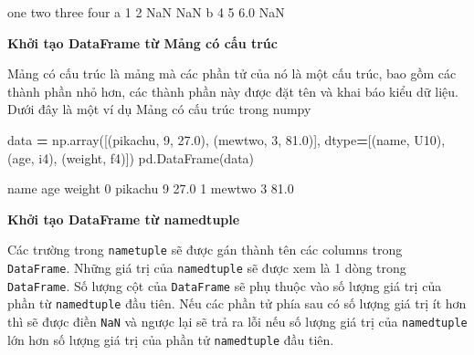 \documentclass[
]{book}
\newenvironment{Shaded}{\begin{snugshade}}{\end{snugshade}}
\newcommand{\DecValTok}[1]{\textcolor[rgb]{0.00,0.00,0.81}{#1}}
\newcommand{\FloatTok}[1]{\textcolor[rgb]{0.00,0.00,0.81}{#1}}
\newcommand{\NormalTok}[1]{#1}
\newcommand{\OperatorTok}[1]{\textcolor[rgb]{0.81,0.36,0.00}{\textbf{#1}}}
\newcommand{\StringTok}[1]{\textcolor[rgb]{0.31,0.60,0.02}{#1}}
\begin{document}
\begin{Shaded}
\begin{Highlighting}[]
\NormalTok{   one  two  three  four}
\NormalTok{a    1    2    NaN   NaN}
\NormalTok{b    4    5    6.0   NaN}
\end{Highlighting}
\end{Shaded}

\textbf{Khởi tạo DataFrame từ Mảng có cấu trúc}

Mảng có cấu trúc là mảng mà các phần tử của nó là một cấu trúc, bao gồm các thành phần nhỏ hơn, các thành phần này được đặt tên và khai báo kiểu dữ liệu.
Dưới đây là một ví dụ Mảng có cấu trúc trong numpy

\begin{Shaded}
\begin{Highlighting}[]
\NormalTok{data }\OperatorTok{=}\NormalTok{ np.array([(}\StringTok{\textquotesingle{}pikachu\textquotesingle{}}\NormalTok{, }\DecValTok{9}\NormalTok{, }\FloatTok{27.0}\NormalTok{), (}\StringTok{\textquotesingle{}mewtwo\textquotesingle{}}\NormalTok{, }\DecValTok{3}\NormalTok{, }\FloatTok{81.0}\NormalTok{)],}
\NormalTok{                        dtype}\OperatorTok{=}\NormalTok{[(}\StringTok{\textquotesingle{}name\textquotesingle{}}\NormalTok{, }\StringTok{\textquotesingle{}U10\textquotesingle{}}\NormalTok{), (}\StringTok{\textquotesingle{}age\textquotesingle{}}\NormalTok{, }\StringTok{\textquotesingle{}i4\textquotesingle{}}\NormalTok{), (}\StringTok{\textquotesingle{}weight\textquotesingle{}}\NormalTok{, }\StringTok{\textquotesingle{}f4\textquotesingle{}}\NormalTok{)])}
\NormalTok{pd.DataFrame(data)}
\end{Highlighting}
\end{Shaded}

\begin{Shaded}
\begin{Highlighting}[]
\NormalTok{       name  age  weight}
\NormalTok{0   pikachu    9    27.0}
\NormalTok{1    mewtwo    3    81.0}
\end{Highlighting}
\end{Shaded}

\textbf{Khởi tạo DataFrame từ namedtuple}

Các trường trong \texttt{nametuple} sẽ được gán thành tên các columns trong \texttt{DataFrame}. Những giá trị của \texttt{namedtuple} sẽ được xem là 1 dòng trong \texttt{DataFrame}.
Số lượng cột của \texttt{DataFrame} sẽ phụ thuộc vào số lượng giá trị của phần từ \texttt{namedtuple} đầu tiên. Nếu các phần tử phía sau có số lượng giá trị ít hơn thì
sẽ được điền \texttt{NaN} và ngược lại sẽ trả ra lỗi nếu số lượng giá trị của \texttt{namedtuple} lớn hơn số lượng giá trị của phần tử \texttt{namedtuple} đầu tiên.
\end{document}
